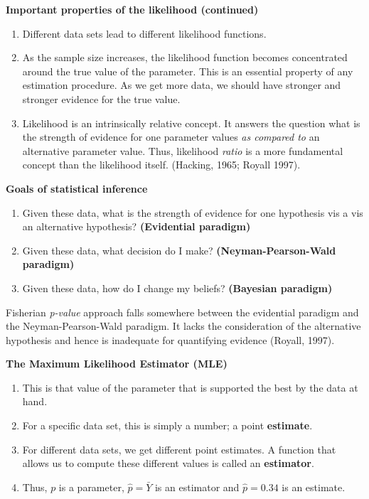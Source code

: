 \documentclass[10pt]{beamer}
\begin{document}
\begin{frame}
\begin{center}
\textbf {Important properties of the likelihood (continued)}
\end{center}

\begin{enumerate}
\item Different data sets lead to different likelihood functions.
\pause 
\item As the sample size increases, the likelihood function becomes concentrated around the true value of the parameter. This is an essential property of any estimation procedure. As we get more data, we should have stronger and stronger evidence for the true value. 
\pause
\item Likelihood is an intrinsically relative concept. It answers the question what is the strength of evidence for one parameter values \emph {as compared to} an alternative parameter value. Thus, likelihood \emph {ratio} is a more fundamental concept than the likelihood itself. (Hacking, 1965; Royall 1997).
\end{enumerate}
\end{frame}

\begin{frame}
\begin{center}
\textbf {Goals of statistical inference}
\end{center}
\begin{enumerate}
\item Given these data, what is the strength of evidence for one hypothesis vis a vis an alternative hypothesis? \textbf {(Evidential paradigm)}
\pause 
\item Given these data, what decision do I make? \textbf {(Neyman-Pearson-Wald paradigm)}
\pause
\item Given these data, how do I change my beliefs? \textbf {(Bayesian paradigm)}
\end{enumerate}
Fisherian \textit {p-value} approach falls somewhere between the evidential paradigm and the Neyman-Pearson-Wald paradigm. It lacks the consideration of the alternative hypothesis and hence is inadequate for quantifying evidence (Royall, 1997).
\end{frame}

\begin{frame}
\begin{center}
\textbf {The Maximum Likelihood Estimator (MLE)}
\end{center}
\begin{enumerate}
\item This is that value of the parameter that is supported the best by the data at hand. 
\pause 
\item For a specific data set, this is simply a number; a point \textbf {estimate}.
\pause
\item For different data sets, we get different point estimates. A function that allows us to compute these different values is called an \textbf {estimator}. 
\item Thus, $p$ is a parameter, $\hat{p}=\bar{Y}$ is an estimator and $\hat{p}=0.34$ is an estimate. 
\end{enumerate}
\end{frame}
\end{document}
